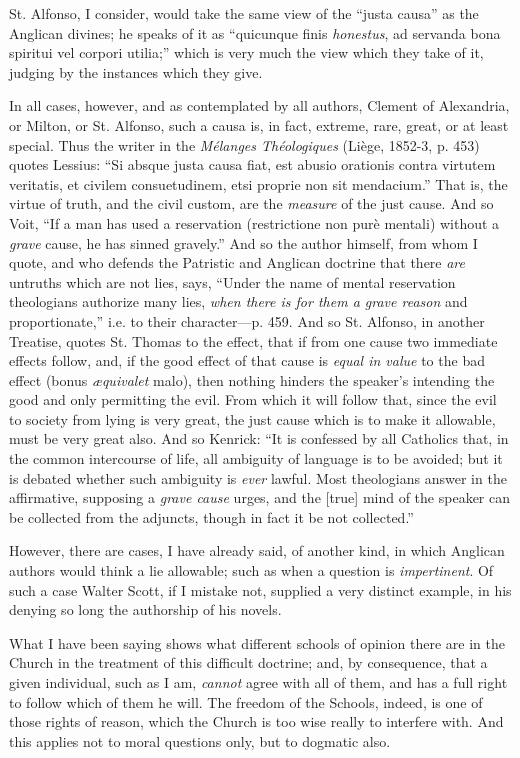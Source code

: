 St. Alfonso, I consider, would take the same view of the ``justa
causa'' as the Anglican divines; he speaks of it as ``quicunque
finis \emph{honestus}, ad servanda bona spiritui vel corpori utilia;''
which is very much the view which they take of it, judging by the
instances which they give.

In all cases, however, and as contemplated by all authors, Clement of
Alexandria, or Milton, or St. Alfonso, such a causa is, in fact,
extreme, rare, great, or at least special. Thus the writer in the \emph{Mélanges Théologiques} (Liège, 1852-3, p. 453) quotes Lessius: ``Si
absque justa causa fiat, est abusio orationis contra virtutem veritatis,
et civilem consuetudinem, etsi proprie non sit mendacium.'' That is, the virtue of truth, and the civil custom, are the \emph{measure}
of the just cause. And so Voit, ``If a man has used a reservation (restrictione
non purè mentali) without a \emph{grave} cause, he has sinned
gravely.'' And so the author himself, from whom I quote, and who
defends the Patristic and Anglican doctrine that there \emph{are} untruths
which are not lies, says, ``Under the name of mental reservation
theologians authorize many lies, \emph{when there is for them a grave
reason} and proportionate,'' i.e. to their character—p. 459.
And so St. Alfonso, in another Treatise, quotes St. Thomas to the
effect, that if from one cause two immediate effects follow, and, if
the good effect of that cause is \emph{equal in value} to the bad effect
(bonus \emph{æquivalet} malo), then nothing hinders the
speaker's intending the good and only permitting the evil. From which it will follow
that, since the evil to society from lying is very great, the just cause
which is to make it allowable, must be very great also. And so Kenrick:
``It is confessed by all Catholics that, in the common intercourse
of life, all ambiguity of language is to be avoided; but it is debated
whether such ambiguity is \emph{ever} lawful. Most theologians answer
in the affirmative, supposing a \emph{grave cause} urges, and the [true] mind of the speaker can be collected from the adjuncts,
though in fact it be not collected.''

However, there are cases, I have already said, of another kind, in
which Anglican authors would think a lie allowable; such as when a
question is \emph{impertinent}. Of such a case Walter Scott, if I mistake not, supplied a very
distinct example, in his denying so long the authorship of his novels.

What I have been saying shows what different schools of opinion there
are in the Church in the treatment of this difficult doctrine;
and, by consequence, that a given individual, such as I am, \emph{cannot}
agree with all of them, and has a full right to follow which of them he will. The freedom of the Schools, indeed, is one of
those rights of reason, which the Church is too wise really to interfere
with. And this applies not to moral questions only, but to dogmatic
also.


